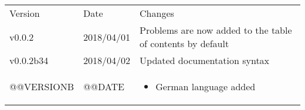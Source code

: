 \begin{tabularx}{\textwidth}{llX}
  Version&Date&Changes\\
  v0.0.2&2018/04/01&Problems are now added to the table of contents by default\\
  v0.0.2b34&2018/04/02&Updated documentation syntax\\
  @@VERSIONB&@@DATE&\begin{itemize}
    \item German language added
  \end{itemize}\\
\end{tabularx}
